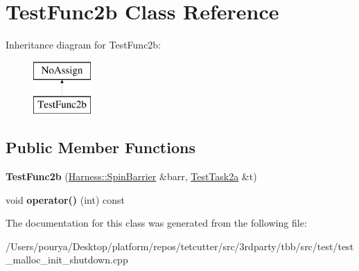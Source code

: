 \hypertarget{classTestFunc2b}{}\section{Test\+Func2b Class Reference}
\label{classTestFunc2b}
Inheritance diagram for Test\+Func2b\+:\begin{figure}[H]
\begin{center}
\leavevmode
\includegraphics[height=2.000000cm]{classTestFunc2b}
\end{center}
\end{figure}
\subsection*{Public Member Functions}
\begin{DoxyCompactItemize}
\item 
\hypertarget{classTestFunc2b_a7675acafb43c33e6eb32127b02a6207f}{}{\bfseries Test\+Func2b} (\hyperlink{classHarness_1_1SpinBarrier}{Harness\+::\+Spin\+Barrier} \&barr, \hyperlink{classNativeParallelForTask}{Test\+Task2a} \&t)\label{classTestFunc2b_a7675acafb43c33e6eb32127b02a6207f}

\item 
\hypertarget{classTestFunc2b_a4e99b53bce6d3a0b23c17b8822f2ce1e}{}void {\bfseries operator()} (int) const \label{classTestFunc2b_a4e99b53bce6d3a0b23c17b8822f2ce1e}

\end{DoxyCompactItemize}


The documentation for this class was generated from the following file\+:\begin{DoxyCompactItemize}
\item 
/\+Users/pourya/\+Desktop/platform/repos/tetcutter/src/3rdparty/tbb/src/test/test\+\_\+malloc\+\_\+init\+\_\+shutdown.\+cpp\end{DoxyCompactItemize}
